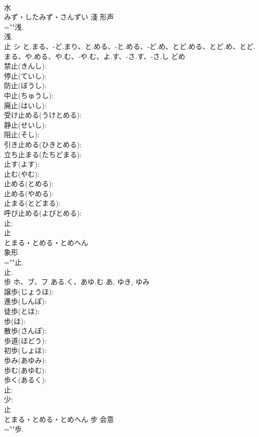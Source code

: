 \documentclass[8pt]{extreport}
\begin{document}
\begin{CJK}{UTF8}{min}
\\	水	
\\	みず・したみず・さんずい	淺	形声 
\\	=""浅.
\\	浅.
\\	止	シ	と.まる、-ど.まり、と.める、-と.める、-ど.め、とど.める、とど.め、とど.まる、や.める、や.む、-や.む、よ.す、-さ.す、-さ.し	どめ	
\\	禁止(きんし): 
\\	停止(ていし): 
\\	防止(ぼうし): 
\\	中止(ちゅうし): 
\\	廃止(はいし): 
\\	受け止める(うけとめる): 
\\	静止(せいし): 
\\	阻止(そし): 
\\	引き止める(ひきとめる): 
\\	立ち止まる(たちどまる): 
\\	止す(よす): 
\\	止む(やむ): 
\\	止める(とめる): 
\\	止める(やめる): 
\\	止まる(とどまる): 
\\	呼び止める(よびとめる): 
\\	止: 
\\	止	
\\	とまる・とめる・とめへん	
\\	象形 
\\	=""止.
\\	止.
\\	歩	ホ、ブ、フ	ある.く、あゆ.む	あ, ゆき, ゆみ	
\\	譲歩(じょうほ): 
\\	進歩(しんぽ): 
\\	徒歩(とほ): 
\\	歩(ほ): 
\\	散歩(さんぽ): 
\\	歩道(ほどう): 
\\	初歩(しょほ): 
\\	歩み(あゆみ): 
\\	歩む(あゆむ): 
\\	歩く(あるく): 
\\	止: 
\\	少: 
\\	止	
\\	とまる・とめる・とめへん	步	会意 
\\	=""歩.

\end{CJK}
\end{document}
